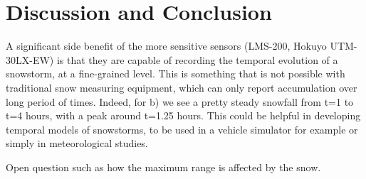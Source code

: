 \section{Discussion and Conclusion}

A significant side benefit of the more sensitive sensors (LMS-200, Hokuyo UTM-30LX-EW) is that they are capable of recording the temporal evolution of a snowstorm, at a fine-grained level. This is something that is not possible with traditional snow measuring equipment, which can only report accumulation over long period of times. Indeed, for b) we see a pretty steady snowfall from t=1 to t=4 hours, with a peak around t=1.25 hours. This could be helpful in developing temporal models of snowstorms, to be used in a vehicle simulator for example or simply in meteorological studies.

Open question such as how the maximum range is affected by the snow.